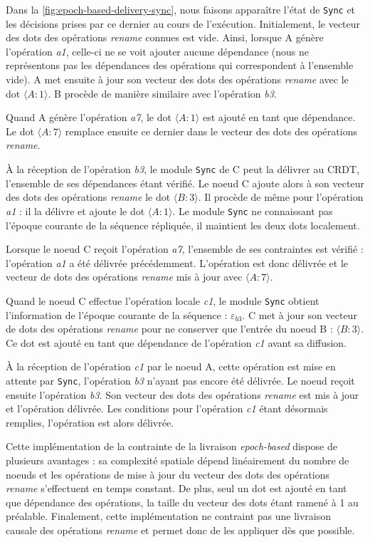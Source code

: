 \documentclass[12pt]{thesul}
\newcommand{\epoch}[1]{$\varepsilon_{#1}$}
\begin{document}
Dans la \autoref{fig:epoch-based-delivery-sync}, nous faisons apparaître l'état de \texttt{Sync} et les décisions prises par ce dernier au cours de l'exécution.
Initialement, le vecteur des dots des opérations \emph{rename} connues est vide.
Ainsi, lorsque A génère l'opération \emph{a1}, celle-ci ne se voit ajouter aucune dépendance (nous ne représentons pas les dépendances des opérations qui correspondent à l'ensemble vide).
A met ensuite à jour son vecteur des dots des opérations \emph{rename} avec le dot $\langle A:1 \rangle$.
B procède de manière similaire avec l'opération \emph{b3}.

Quand A génère l'opération \emph{a7}, le dot $\langle A:1 \rangle$ est ajouté en tant que dépendance.
Le dot $\langle A:7 \rangle$ remplace ensuite ce dernier dans le vecteur des dots des opérations \emph{rename}.

À la réception de l'opération \emph{b3}, le module \texttt{Sync} de C peut la délivrer au \ac{CRDT}, l'ensemble de ses dépendances étant vérifié.
Le noeud C ajoute alors à son vecteur des dots des opérations \emph{rename} le dot $\langle B:3 \rangle$.
Il procède de même pour l'opération \emph{a1} : il la délivre et ajoute le dot $\langle A:1 \rangle$.
Le module \texttt{Sync} ne connaissant pas l'époque courante de la séquence répliquée, il maintient les deux dots localement.

Lorsque le noeud C reçoit l'opération \emph{a7}, l'ensemble de ses contraintes est vérifié : l'opération \emph{a1} a été délivrée précédemment.
L'opération est donc délivrée et le vecteur de dots des opérations \emph{rename} mis à jour avec $\langle A:7 \rangle$.

Quand le noeud C effectue l'opération locale \emph{c1}, le module \texttt{Sync} obtient l'information de l'époque courante de la séquence : \epoch{b3}.
C met à jour son vecteur de dots des opérations \emph{rename} pour ne conserver que l'entrée du noeud B : $\langle B:3 \rangle$.
Ce dot est ajouté en tant que dépendance de l'opération \emph{c1} avant sa diffusion.

À la réception de l'opération \emph{c1} par le noeud A, cette opération est mise en attente par \texttt{Sync}, l'opération \emph{b3} n'ayant pas encore été délivrée.
Le noeud reçoit ensuite l'opération \emph{b3}.
Son vecteur des dots des opérations \emph{rename} est mis à jour et l'opération délivrée.
Les conditions pour l'opération \emph{c1} étant désormais remplies, l'opération est alors délivrée.

Cette implémentation de la contrainte de la livraison \emph{epoch-based} dispose de plusieurs avantages : sa complexité spatiale dépend linéairement du nombre de noeuds et les opérations de mise à jour du vecteur des dots des opérations \emph{rename} s'effectuent en temps constant.
De plus, seul un dot est ajouté en tant que dépendance des opérations, la taille du vecteur des dots étant ramené à 1 au préalable.
Finalement, cette implémentation ne contraint pas une livraison causale des opérations \emph{rename} et permet donc de les appliquer dès que possible.
\end{document}
